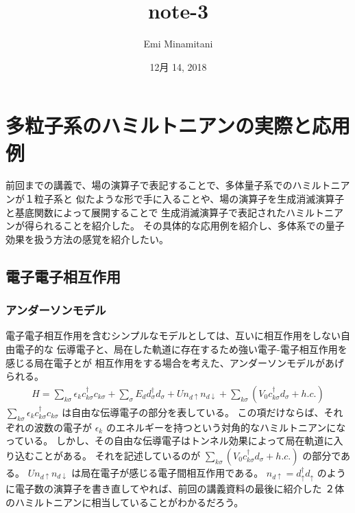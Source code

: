 \documentclass[letterpaper,10pt,dvipdfmx]{sphinxhowto}
\title{note-3}
\date{12月 14, 2018}
\author{Emi Minamitani}
\begin{document}
\maketitle
\sphinxtableofcontents
{}\label{\detokenize{index::doc}}



\section{多粒子系のハミルトニアンの実際と応用例}
\label{\detokenize{index:id2}}\label{\detokenize{index:id1}}
前回までの講義で、場の演算子で表記することで、多体量子系でのハミルトニアンが１粒子系と
似たような形で手に入ることや、場の演算子を生成消滅演算子と基底関数によって展開することで
生成消滅演算子で表記されたハミルトニアンが得られることを紹介した。
その具体的な応用例を紹介し、多体系での量子効果を扱う方法の感覚を紹介したい。


\subsection{電子電子相互作用}
\label{\detokenize{index:id3}}

\subsubsection{アンダーソンモデル}
\label{\detokenize{index:id4}}
電子電子相互作用を含むシンプルなモデルとしては、互いに相互作用をしない自由電子的な
伝導電子と、局在した軌道に存在するため強い電子-電子相互作用を感じる局在電子とが
相互作用をする場合を考えた、アンダーソンモデルがあげられる。
\begin{equation*}
\begin{split}H=\sum_{k\sigma} \epsilon_k c_{k\sigma}^\dagger c_{k\sigma}+\sum_{\sigma}E_d d_{\sigma}^\dagger
d_{\sigma} +Un_{d\uparrow}n_{d\downarrow} +\sum_{k\sigma}(V_{0}
c_{k\sigma}^\dagger d_{\sigma} + h.c.)\end{split}
\end{equation*}
\(\sum_{k\sigma} \epsilon_k c_{k\sigma}^\dagger c_{k\sigma}\)
は自由な伝導電子の部分を表している。
この項だけならば、それぞれの波数の電子が
\(\epsilon_k\)
のエネルギーを持つという対角的なハミルトニアンになっている。
しかし、その自由な伝導電子はトンネル効果によって局在軌道に入り込むことがある。
それを記述しているのが
\(\sum_{k\sigma}(V_{0} c_{k\sigma}^\dagger d_{\sigma} + h.c.)\)
の部分である。
\(Un_{d\uparrow}n_{d\downarrow}\)
は局在電子が感じる電子間相互作用である。
\(n_{d\uparrow}=d^\dagger_\uparrow d_\uparrow\)
のように電子数の演算子を書き直してやれば、前回の講義資料の最後に紹介した
２体のハミルトニアンに相当していることがわかるだろう。
\end{document}
